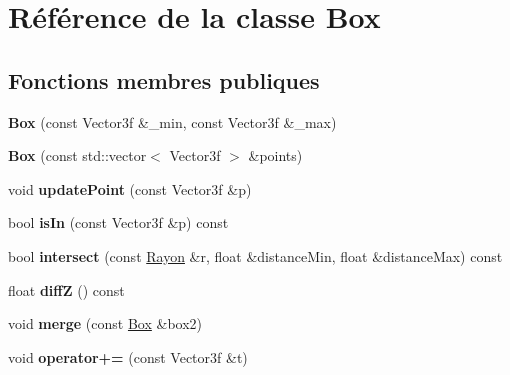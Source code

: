 \hypertarget{class_box}{}\section{Référence de la classe Box}
\label{class_box}
\subsection*{Fonctions membres publiques}
\begin{DoxyCompactItemize}
\item 
\hypertarget{class_box_aa232abb63b2b72d93791c74a96ac7de9}{}{\bfseries Box} (const Vector3f \&\+\_\+min, const Vector3f \&\+\_\+max)\label{class_box_aa232abb63b2b72d93791c74a96ac7de9}

\item 
\hypertarget{class_box_a2353559b5ce40e7edcc85daddd86f292}{}{\bfseries Box} (const std\+::vector$<$ Vector3f $>$ \&points)\label{class_box_a2353559b5ce40e7edcc85daddd86f292}

\item 
\hypertarget{class_box_ad4ee0fca654414f2f9f5092f70ab92e7}{}void {\bfseries update\+Point} (const Vector3f \&p)\label{class_box_ad4ee0fca654414f2f9f5092f70ab92e7}

\item 
\hypertarget{class_box_a2d6c41818d3d77ba71866528f5e6ccac}{}bool {\bfseries is\+In} (const Vector3f \&p) const \label{class_box_a2d6c41818d3d77ba71866528f5e6ccac}

\item 
\hypertarget{class_box_a6ce97deba91479b4fa66c260c1a37c8a}{}bool {\bfseries intersect} (const \hyperlink{class_rayon}{Rayon} \&r, float \&distance\+Min, float \&distance\+Max) const \label{class_box_a6ce97deba91479b4fa66c260c1a37c8a}

\item 
\hypertarget{class_box_a173e401890b2cb5af0ba69d78c9df413}{}float {\bfseries diff\+Z} () const \label{class_box_a173e401890b2cb5af0ba69d78c9df413}

\item 
\hypertarget{class_box_a5aebe0463a5c45d1cf966fbccabef94f}{}void {\bfseries merge} (const \hyperlink{class_box}{Box} \&box2)\label{class_box_a5aebe0463a5c45d1cf966fbccabef94f}

\item 
\hypertarget{class_box_a8b1ad9cb82546788f3ad6001429b5c5f}{}void {\bfseries operator+=} (const Vector3f \&t)\label{class_box_a8b1ad9cb82546788f3ad6001429b5c5f}

\end{DoxyCompactItemize}
